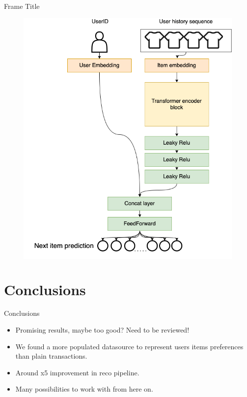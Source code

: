 \documentclass{beamer}
\begin{document}
\begin{frame}{Frame Title}
\begin{figure}[!htb]
\endminipage\hfill
{}%
  \includegraphics[width=\linewidth]{images/models/Transformer.png}
\endminipage
\end{figure}   
\end{frame}




\section{Conclusions}
\begin{frame}{Conclusions}

\begin{itemize}
    \item Promising results, maybe too good? Need to be reviewed!
    \item We found a more populated datasource to represent users items preferences than plain transactions.
    \item Around x5 improvement in reco pipeline.
    \item Many possibilities to work with from here on.
\end{itemize}
\end{frame}
\end{document}
